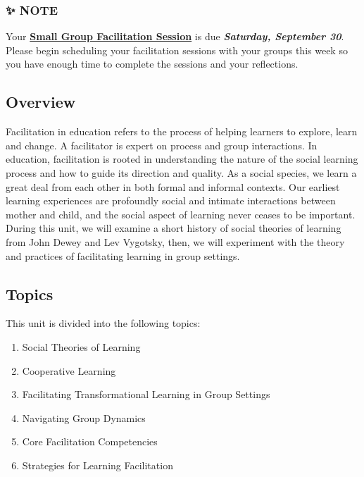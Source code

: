 \documentclass[
]{book}
\providecommand{\tightlist}{%
  \setlength{\itemsep}{0pt}\setlength{\parskip}{0pt}}
\begin{document}
\begin{blank}
\hypertarget{note}{%
\subsubsection*{✨ NOTE}\label{note}}

Your \href{https://far.twu.ca/ldrs/663-202109/assignments}{\textbf{Small Group Facilitation Session}} is due {\textbf{\emph{Saturday, September 30}}}. Please begin scheduling your facilitation sessions with your groups this week so you have enough time to complete the sessions and your reflections.
\end{blank}

\hypertarget{overview-1}{%
\subsection*{Overview}\label{overview-1}}

Facilitation in education refers to the process of helping learners to explore, learn and change. A facilitator is expert on process and group interactions. In education, facilitation is rooted in understanding the nature of the social learning process and how to guide its direction and quality. As a social species, we learn a great deal from each other in both formal and informal contexts. Our earliest learning experiences are profoundly social and intimate interactions between mother and child, and the social aspect of learning never ceases to be important. During this unit, we will examine a short history of social theories of learning from John Dewey and Lev Vygotsky, then, we will experiment with the theory and practices of facilitating learning in group settings.

\hypertarget{topics-1}{%
\subsection*{Topics}\label{topics-1}}

This unit is divided into the following topics:

\begin{enumerate}
\def\labelenumi{\arabic{enumi}.}
\tightlist
\item
  Social Theories of Learning
\item
  Cooperative Learning
\item
  Facilitating Transformational Learning in Group Settings
\item
  Navigating Group Dynamics
\item
  Core Facilitation Competencies
\item
  Strategies for Learning Facilitation
\end{enumerate}
\end{document}
